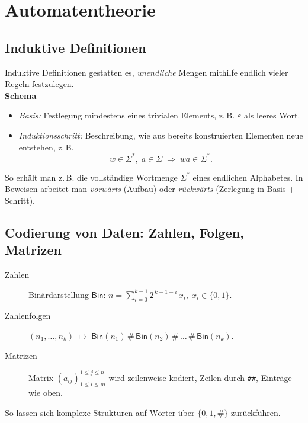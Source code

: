 
\chapter{Automatentheorie}

\section{Induktive Definitionen}
Induktive Definitionen gestatten es, \emph{unendliche} Mengen mithilfe endlich vieler Regeln festzulegen.\\[4pt]
\textbf{Schema}
\begin{itemize}
  \item \textit{Basis:} Festlegung mindestens eines trivialen Elements, z.\,B. $\varepsilon$ als leeres Wort.
  \item \textit{Induktionsschritt:} Beschreibung, wie aus bereits konstruierten Elementen neue entstehen, z.\,B.
        \[ w\in\Sigma^{\ast},\; a\in\Sigma \;\Longrightarrow\; w a\in\Sigma^{\ast}. \]
\end{itemize}
So erhält man z.\,B. die vollständige Wortmenge $\Sigma^{\ast}$ eines endlichen Alphabetes.  
In Beweisen arbeitet man \emph{vorwärts} (Aufbau) oder \emph{rückwärts} (Zerlegung in Basis + Schritt).

\section{Codierung von Daten: Zahlen, Folgen, Matrizen}
\begin{description}
  \item[Zahlen] Binärdarstellung $\mathsf{Bin}$: $n=\sum_{i=0}^{k-1}2^{\,k-1-i}\,x_i,\;x_i\in\{0,1\}$.
  \item[Zahlenfolgen] $(n_1,\dots,n_k)\;\mapsto\;
        \mathsf{Bin}(n_1)\,\#\,\mathsf{Bin}(n_2)\,\#\,\dots\,\#\,\mathsf{Bin}(n_k)$.
  \item[Matrizen] Matrix $(a_{ij})_{1\le i\le m}^{1\le j\le n}$ wird zeilenweise kodiert, Zeilen durch
        \texttt{\#\#}, Einträge wie oben.
\end{description}
So lassen sich komplexe Strukturen auf Wörter über $\{0,1,\#\}$ zurückführen.

